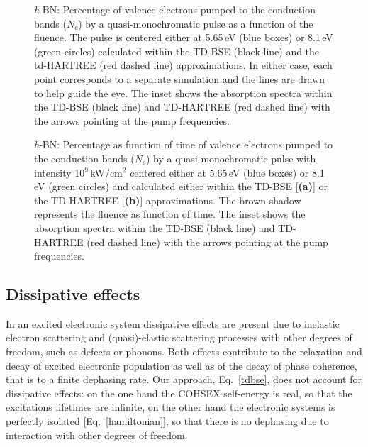 \begin{figure}[ht]
\centering
\caption{\footnotesize{
{\it h}-BN: Percentage of valence electrons pumped to the conduction
bands ($N_c$) by a quasi-monochromatic pulse as a function of the
fluence. The pulse is centered either at 5.65\,eV (blue boxes) or 8.1\,eV (green circles)
 calculated within the TD-BSE (black line) and the td-HARTREE (red
 dashed line) approximations. In either case, each point corresponds to
 a separate simulation and the lines are drawn to help guide the eye. 
 The inset shows the absorption spectra within the TD-BSE (black line) and TD-HARTREE (red dashed line) with the arrows pointing at the pump frequencies.}} 
\label{Nc_Flu}
\end{figure}

\begin{figure}[ht]
\centering
\caption{\footnotesize{
 {\it h}-BN: Percentage as function of time of valence electrons pumped to the conduction bands ($N_c$) by a quasi-monochromatic pulse with intensity 10$^9$\,kW/cm$^2$ centered either at 5.65\,eV (blue boxes) or 8.1\,eV (green circles)
 and calculated either within the TD-BSE [{\bf(a)}] or the TD-HARTREE [{\bf(b)}]
 approximations. The brown shadow represents the fluence as function of time. 
The inset shows the absorption spectra within the TD-BSE (black line) and TD-HARTREE (red dashed line) with the arrows pointing at the pump frequencies.}} 
\label{deltaN}
\end{figure}

\subsection{Dissipative effects}
\label{ss:stdystt}

In an excited electronic system dissipative effects are present due to inelastic electron scattering and
(quasi)-elastic scattering processes with other degrees of freedom, such as defects or phonons. Both effects contribute
to the relaxation and decay of excited electronic population  as well as of the 
decay of
phase coherence, that is to a finite dephasing rate. Our approach, Eq.~\eqref{tdbse}, does not account for dissipative
effects: on the one hand the COHSEX self-energy is real, so that the excitations lifetimes are infinite, on the other hand the electronic systems is
perfectly isolated [Eq.~\eqref{hamiltonian}], so that there is no dephasing due to interaction with other degrees of freedom.

